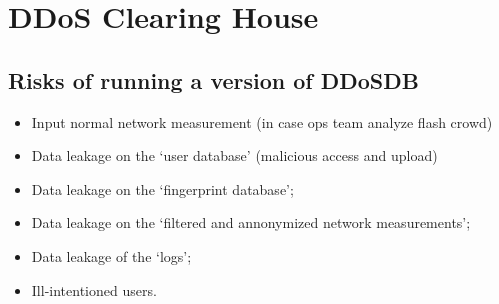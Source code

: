 \section{DDoS Clearing House}
\label{sec:ddos_clearinghouse}

\subsection{Risks of running a version of DDoSDB}

\begin{itemize}
	\item Input normal network measurement (in case ops team analyze flash crowd)
	\item Data leakage on the `user database’ (malicious access and upload)
	\item Data leakage on the `fingerprint database’;
	\item Data leakage on the `filtered and annonymized network measurements’;
	\item Data leakage of the `logs';
	\item Ill-intentioned users.
\end{itemize}

